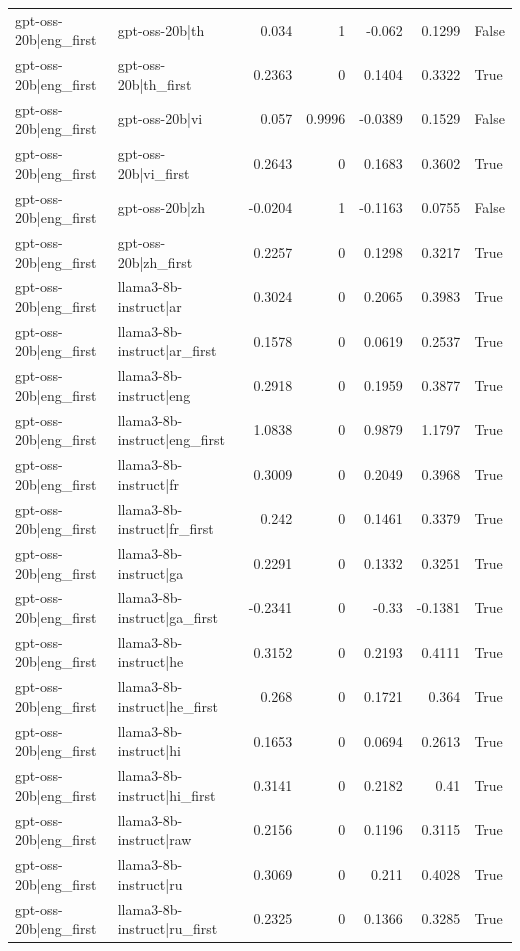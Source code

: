 \begin{table}
\begin{tabular}{l l r r r r l}
gpt-oss-20b|eng_first & gpt-oss-20b|th & 0.034 & 1 & -0.062 & 0.1299 & False \\
gpt-oss-20b|eng_first & gpt-oss-20b|th_first & 0.2363 & 0 & 0.1404 & 0.3322 & True \\
gpt-oss-20b|eng_first & gpt-oss-20b|vi & 0.057 & 0.9996 & -0.0389 & 0.1529 & False \\
gpt-oss-20b|eng_first & gpt-oss-20b|vi_first & 0.2643 & 0 & 0.1683 & 0.3602 & True \\
gpt-oss-20b|eng_first & gpt-oss-20b|zh & -0.0204 & 1 & -0.1163 & 0.0755 & False \\
gpt-oss-20b|eng_first & gpt-oss-20b|zh_first & 0.2257 & 0 & 0.1298 & 0.3217 & True \\
gpt-oss-20b|eng_first & llama3-8b-instruct|ar & 0.3024 & 0 & 0.2065 & 0.3983 & True \\
gpt-oss-20b|eng_first & llama3-8b-instruct|ar_first & 0.1578 & 0 & 0.0619 & 0.2537 & True \\
gpt-oss-20b|eng_first & llama3-8b-instruct|eng & 0.2918 & 0 & 0.1959 & 0.3877 & True \\
gpt-oss-20b|eng_first & llama3-8b-instruct|eng_first & 1.0838 & 0 & 0.9879 & 1.1797 & True \\
gpt-oss-20b|eng_first & llama3-8b-instruct|fr & 0.3009 & 0 & 0.2049 & 0.3968 & True \\
gpt-oss-20b|eng_first & llama3-8b-instruct|fr_first & 0.242 & 0 & 0.1461 & 0.3379 & True \\
gpt-oss-20b|eng_first & llama3-8b-instruct|ga & 0.2291 & 0 & 0.1332 & 0.3251 & True \\
gpt-oss-20b|eng_first & llama3-8b-instruct|ga_first & -0.2341 & 0 & -0.33 & -0.1381 & True \\
gpt-oss-20b|eng_first & llama3-8b-instruct|he & 0.3152 & 0 & 0.2193 & 0.4111 & True \\
gpt-oss-20b|eng_first & llama3-8b-instruct|he_first & 0.268 & 0 & 0.1721 & 0.364 & True \\
gpt-oss-20b|eng_first & llama3-8b-instruct|hi & 0.1653 & 0 & 0.0694 & 0.2613 & True \\
gpt-oss-20b|eng_first & llama3-8b-instruct|hi_first & 0.3141 & 0 & 0.2182 & 0.41 & True \\
gpt-oss-20b|eng_first & llama3-8b-instruct|raw & 0.2156 & 0 & 0.1196 & 0.3115 & True \\
gpt-oss-20b|eng_first & llama3-8b-instruct|ru & 0.3069 & 0 & 0.211 & 0.4028 & True \\
gpt-oss-20b|eng_first & llama3-8b-instruct|ru_first & 0.2325 & 0 & 0.1366 & 0.3285 & True \\

\end{tabular}
\end{table}
